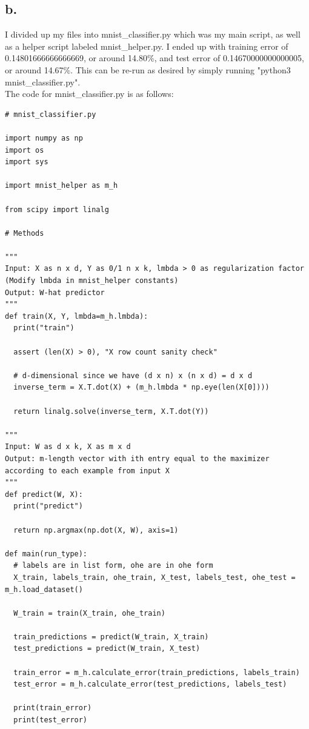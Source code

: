 \documentclass{article}
\newcommand{\1}{\mathbf{1}}
\begin{document}
{\subsection*{b.}

I divided up my files into mnist\_classifier.py which was my main script, as well as a helper script labeled mnist\_helper.py. I ended up with training error of 0.14801666666666669, or around 14.80\%, and test error of 0.14670000000000005, or around 14.67\%. This can be re-run as desired by simply running "python3 mnist\_classifier.py". \\
The code for mnist\_classifier.py is as follows: \\

\begin{verbatim}
# mnist_classifier.py

import numpy as np
import os
import sys

import mnist_helper as m_h

from scipy import linalg

# Methods

"""
Input: X as n x d, Y as 0/1 n x k, lmbda > 0 as regularization factor
(Modify lmbda in mnist_helper constants)
Output: W-hat predictor
"""
def train(X, Y, lmbda=m_h.lmbda):
  print("train")

  assert (len(X) > 0), "X row count sanity check"

  # d-dimensional since we have (d x n) x (n x d) = d x d
  inverse_term = X.T.dot(X) + (m_h.lmbda * np.eye(len(X[0])))

  return linalg.solve(inverse_term, X.T.dot(Y))

"""
Input: W as d x k, X as m x d
Output: m-length vector with ith entry equal to the maximizer
according to each example from input X
"""
def predict(W, X):
  print("predict")

  return np.argmax(np.dot(X, W), axis=1)

def main(run_type):
  # labels are in list form, ohe are in ohe form
  X_train, labels_train, ohe_train, X_test, labels_test, ohe_test = m_h.load_dataset()

  W_train = train(X_train, ohe_train)
  
  train_predictions = predict(W_train, X_train)
  test_predictions = predict(W_train, X_test)

  train_error = m_h.calculate_error(train_predictions, labels_train)
  test_error = m_h.calculate_error(test_predictions, labels_test)

  print(train_error)
  print(test_error)


\end{verbatim}}
\end{document}
